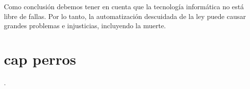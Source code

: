 \documentclass[12pt]{report} %
\begin{document}
Como conclusión debemos tener en cuenta que la tecnología informática no está libre de fallas. Por lo tanto, la automatización descuidada de la ley puede causar grandes problemas e injusticias, incluyendo la muerte.



















\chapter{cap perros }
\label{capcapperros}
.



\clearpage
{}
 

\printbibliography






\end{document}
